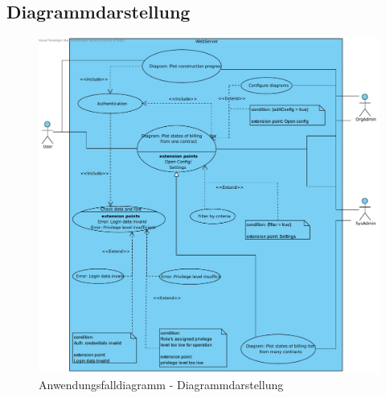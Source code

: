 \clearpage

\subsection{Diagrammdarstellung}

\begin{figure}[h]
	\centering
	\includegraphics[width=\linewidth]{img/diagrams/Manage_Diagram.pdf}
	\caption{Anwendungsfalldiagramm - Diagrammdarstellung}
	\label{fig:anwendungsfalldiagramm-dia-verwaltung}
\end{figure}

\newpage

